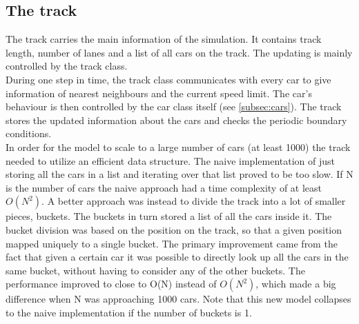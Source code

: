 \documentclass[11pt,a4paper,twocolumn]{article}
\begin{document}
\subsection{The track}\label{subsec:track}
The track carries the main information of the simulation. It contains track length, number of lanes and a list of all cars on the track. The updating is mainly controlled by the track class.  \\
During one step in time, the track class communicates with every car to give information of nearest neighbours and the current speed limit. The car's behaviour is then controlled by the car class itself (see \ref{subsec:cars}). The track stores the updated information about the cars and checks the periodic boundary conditions. \\

In order for the model to scale to a large number of cars (at least 1000) the track needed to utilize an efficient data structure. The naive implementation of just storing all the cars in a list and iterating over that list proved to be too slow. If N is the number of cars the naive approach had a time complexity of at least $O(N^2)$. A better approach was instead to divide the track into a lot of smaller pieces, buckets. The buckets in turn stored a list of all the cars inside it. The bucket division was based on the position on the track, so that a given position mapped uniquely to a single bucket. The primary improvement came from the fact that given a certain car it was possible to directly look up all the cars in the same bucket, without having to consider any of the other buckets. The performance improved to close to O(N) instead of $O(N^2)$, which made a big difference when N was approaching 1000 cars. Note that this new model collapses to the naive implementation if the number of buckets is 1.
\end{document}
